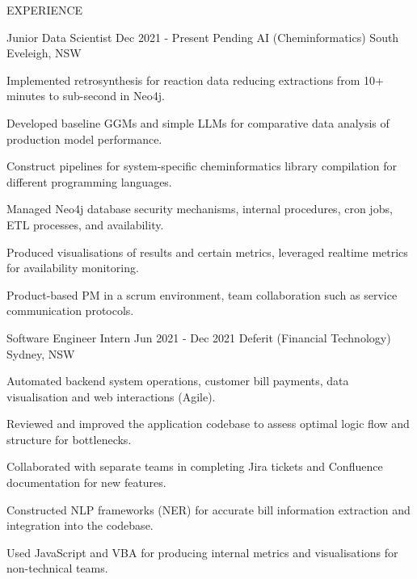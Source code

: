 
\begin{ResumeSection}{EXPERIENCE}

    \begin{DatedField}
        {Junior Data Scientist}
        {Dec 2021 - Present}
        {Pending AI (Cheminformatics)}
        {South Eveleigh, NSW}
        \item Implemented retrosynthesis for reaction data reducing extractions from 10+ minutes to sub-second in Neo4j.
        \item Developed baseline GGMs and simple LLMs for comparative data analysis of production model performance.
        \item Construct pipelines for system-specific cheminformatics library compilation for different programming languages.
        \item Managed Neo4j database security mechanisms, internal procedures, cron jobs, ETL processes, and availability.
        \item Produced visualisations of results and certain metrics, leveraged realtime metrics for availability monitoring.
        \item Product-based PM in a scrum environment, team collaboration such as service communication protocols.
    \end{DatedField}

    \newpage
    
    \begin{DatedField}
        {Software Engineer Intern}
        {Jun 2021 - Dec 2021}
        {Deferit (Financial Technology)}
        {Sydney, NSW}
        \item Automated backend system operations, customer bill payments, data visualisation and web interactions (Agile).
        \item Reviewed and improved the application codebase to assess optimal logic flow and structure for bottlenecks.
        \item Collaborated with separate teams in completing Jira tickets and Confluence documentation for new features.
        \item Constructed NLP frameworks (NER) for accurate bill information extraction and integration into the codebase.
        \item Used JavaScript and VBA for producing internal metrics and visualisations for non-technical teams.
    \end{DatedField}

\end{ResumeSection} 